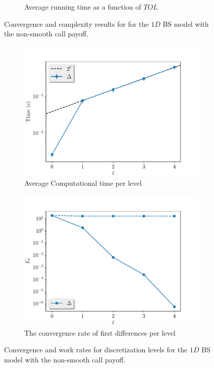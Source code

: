 \documentclass[11pt]{article}
\begin{document}
\begin{figure}[!h]
\begin{subfigure}{.5\textwidth}
		\caption{Average running time as a function of $TOL$}
		\label{fig:misc_1D_BS_non_smooth_2steps_sub2}
	\end{subfigure}%
	\caption{Convergence and complexity results for for the $1D$ BS model with the non-smooth call payoff.}
	\label{fig:misc_1D_BS_nonsmooth_2steps_2}
\end{figure}



\begin{figure}[!h]
	\centering
	\begin{subfigure}{.5\textwidth}
		\centering
		\includegraphics[width=0.95\linewidth]{./figures/1D_BS_2_steps_non_smooth/level_work.pdf}
		\caption{Average Computational time per level}
		\label{fig:misc_1D_BS_non_smooth_2steps_sub3}
	\end{subfigure}%
	\begin{subfigure}{.5\textwidth}
		\centering
		\includegraphics[width=0.95\linewidth]{./figures/1D_BS_2_steps_non_smooth/levels_error_rate.pdf}
		\caption{ The convergence rate of first differences per level}
		\label{fig:misc_1D_BS_non_smooth_2steps_sub4}
	\end{subfigure}%
	\caption{Convergence and work rates for discretization levels for the $1D$ BS model with the non-smooth call payoff.}
	\label{fig:misc_1D_BS_2teps_2}
\end{figure}
\end{document}
